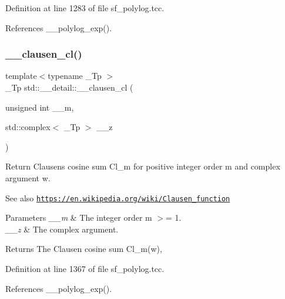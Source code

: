 Definition at line 1283 of file sf\+\_\+polylog.\+tcc.



References \+\_\+\+\_\+polylog\+\_\+exp().

\mbox{\label{namespacestd_1_1____detail_ab09b3cb1a96ba96e7fddadd0ea717b1c}} 
\subsubsection{\texorpdfstring{\+\_\+\+\_\+clausen\+\_\+cl()}{\_\_clausen\_cl()}\hspace{0.1cm}{\footnotesize\ttfamily [1/2]}}
{\footnotesize\ttfamily template$<$typename \+\_\+\+Tp $>$ \\
\+\_\+\+Tp std\+::\+\_\+\+\_\+detail\+::\+\_\+\+\_\+clausen\+\_\+cl (\begin{DoxyParamCaption}\item[{unsigned int}]{\+\_\+\+\_\+m,  }\item[{std\+::complex$<$ \+\_\+\+Tp $>$}]{\+\_\+\+\_\+z }\end{DoxyParamCaption})}

Return Clausen\textquotesingle{}s cosine sum Cl\+\_\+m for positive integer order m and complex argument w. \begin{DoxySeeAlso}{See also}
\href{https://en.wikipedia.org/wiki/Clausen_function}{\tt https\+://en.\+wikipedia.\+org/wiki/\+Clausen\+\_\+function}
\end{DoxySeeAlso}

\begin{DoxyParams}{Parameters}
{\em \+\_\+\+\_\+m} & The integer order m $>$= 1. \\
\hline
{\em \+\_\+\+\_\+z} & The complex argument. \\
\hline
\end{DoxyParams}
\begin{DoxyReturn}{Returns}
The Clausen cosine sum Cl\+\_\+m(w), 
\end{DoxyReturn}


Definition at line 1367 of file sf\+\_\+polylog.\+tcc.



References \+\_\+\+\_\+polylog\+\_\+exp().

